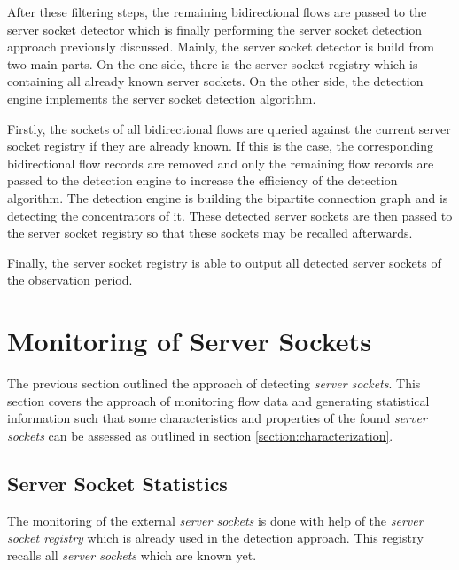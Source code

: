 After these filtering steps, the remaining bidirectional flows are passed to the 
server socket detector which is finally performing the server socket detection 
approach previously discussed. Mainly, the server socket detector is build from 
two main parts. On the one side, there is the server socket registry which is 
containing all already known server sockets. On the other side, the detection 
engine implements the server socket detection algorithm. 

Firstly, the sockets of all bidirectional flows are queried against the current 
server socket registry if they are already known. If this is the case, the 
corresponding bidirectional flow records are removed and only the remaining flow 
records are passed to the detection engine to increase the efficiency of the 
detection algorithm. The detection engine is building the bipartite connection 
graph and is detecting the concentrators of it. These detected server sockets 
are then passed to the server socket registry so that these sockets may be 
recalled afterwards. 

Finally, the server socket registry is able to output all detected server 
sockets of the observation period. 

\newpage
\section{Monitoring of Server Sockets 
\label{section:socket_tracking}}

The previous section outlined the approach of detecting \emph{server sockets}. 
This section covers the approach of monitoring flow data and generating 
statistical information such that some characteristics and properties of the 
found \emph{server sockets} can be assessed as outlined in section 
\ref{section:characterization}.

\subsection{Server Socket Statistics}

The monitoring of the external 
\emph{server sockets} is done with help of the \emph{server socket registry} 
which is already used in the detection approach. This registry recalls all 
\emph{server sockets} which are known yet. 

